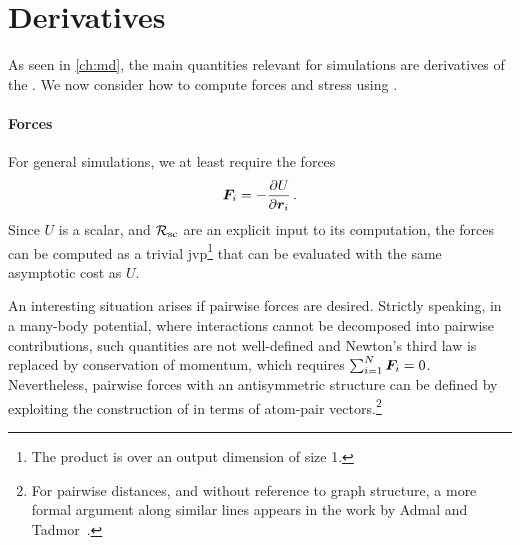
\section{Derivatives}

As seen in \cref{ch:md}, the main quantities relevant for \md simulations are derivatives of the \pes. We now consider how to compute forces and stress using \ad.

\paragraph{Forces} For general \md simulations, we at least require the forces
\begin{equation}
    \F_i =-\dur{}{i}{} \, . \label{eq:glp_f_basic}
\end{equation}
Since $U$ is a scalar, and $\mathcal{R_{\text{sc}}}$ are an explicit input to its computation, the forces can be computed as a trivial \gls{jvp}\footnote{The product is over an output dimension of size \num{1}.} that can be evaluated with the same asymptotic cost as $U$.

An interesting situation arises if pairwise forces are desired. Strictly speaking, in a many-body potential, where interactions cannot be decomposed into pairwise contributions, such quantities are not well-defined and Newton's third law is replaced by conservation of momentum, which requires $\sum_{i=1}^N\nolimits \boldsymbol{F}_i = 0$. Nevertheless, pairwise forces with an antisymmetric structure can be defined by exploiting the construction of \glps{} in terms of atom-pair vectors.\footnote[][]{For pairwise distances, and without reference to graph structure, a more formal argument along similar lines appears in the work by Admal and Tadmor~\cite{at2011t}.}

